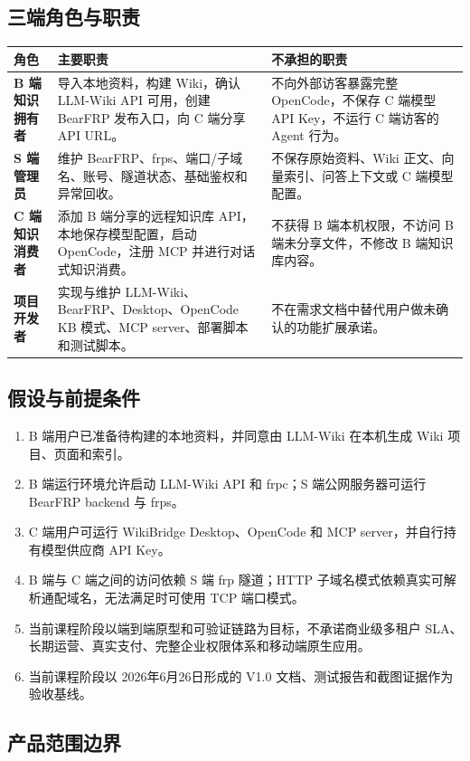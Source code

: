 \documentclass[UTF8,a4paper,12pt,fontset=fandol]{ctexart}
\begin{document}
\subsection{三端角色与职责}
\begin{longtable}{>{\bfseries}p{3.0cm}p{5.8cm}p{5.4cm}}
\toprule
角色 & 主要职责 & 不承担的职责 \\
\midrule
B 端知识拥有者 & 导入本地资料，构建 Wiki，确认 LLM-Wiki API 可用，创建 BearFRP 发布入口，向 C 端分享 API URL。 & 不向外部访客暴露完整 OpenCode，不保存 C 端模型 API Key，不运行 C 端访客的 Agent 行为。 \\
S 端管理员 & 维护 BearFRP、frps、端口/子域名、账号、隧道状态、基础鉴权和异常回收。 & 不保存原始资料、Wiki 正文、向量索引、问答上下文或 C 端模型配置。 \\
C 端知识消费者 & 添加 B 端分享的远程知识库 API，本地保存模型配置，启动 OpenCode，注册 MCP 并进行对话式知识消费。 & 不获得 B 端本机权限，不访问 B 端未分享文件，不修改 B 端知识库内容。 \\
项目开发者 & 实现与维护 LLM-Wiki、BearFRP、Desktop、OpenCode KB 模式、MCP server、部署脚本和测试脚本。 & 不在需求文档中替代用户做未确认的功能扩展承诺。 \\
\bottomrule
\end{longtable}

\subsection{假设与前提条件}
\begin{enumerate}
  \item B 端用户已准备待构建的本地资料，并同意由 LLM-Wiki 在本机生成 Wiki 项目、页面和索引。
  \item B 端运行环境允许启动 LLM-Wiki API 和 frpc；S 端公网服务器可运行 BearFRP backend 与 frps。
  \item C 端用户可运行 WikiBridge Desktop、OpenCode 和 MCP server，并自行持有模型供应商 API Key。
  \item B 端与 C 端之间的访问依赖 S 端 frp 隧道；HTTP 子域名模式依赖真实可解析通配域名，无法满足时可使用 TCP 端口模式。
  \item 当前课程阶段以端到端原型和可验证链路为目标，不承诺商业级多租户 SLA、长期运营、真实支付、完整企业权限体系和移动端原生应用。
  \item 当前课程阶段以 2026年6月26日形成的 V1.0 文档、测试报告和截图证据作为验收基线。
\end{enumerate}

\subsection{产品范围边界}
\end{document}

